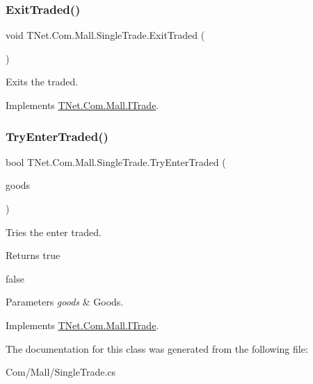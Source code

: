 \subsubsection{\texorpdfstring{Exit\+Traded()}{ExitTraded()}}
{\footnotesize\ttfamily void T\+Net.\+Com.\+Mall.\+Single\+Trade.\+Exit\+Traded (\begin{DoxyParamCaption}{ }\end{DoxyParamCaption})}



Exits the traded. 



Implements \mbox{\hyperlink{interface_t_net_1_1_com_1_1_mall_1_1_i_trade_acdc77a56a409b403d8bad022031c8bbf}{T\+Net.\+Com.\+Mall.\+I\+Trade}}.

\mbox{\label{class_t_net_1_1_com_1_1_mall_1_1_single_trade_a1648ff3445ce2e71ba32fb4c1c0dfebf}} 
\subsubsection{\texorpdfstring{Try\+Enter\+Traded()}{TryEnterTraded()}}
{\footnotesize\ttfamily bool T\+Net.\+Com.\+Mall.\+Single\+Trade.\+Try\+Enter\+Traded (\begin{DoxyParamCaption}\item[{\mbox{\hyperlink{class_t_net_1_1_com_1_1_model_1_1_goods_data}{Goods\+Data}}}]{goods }\end{DoxyParamCaption})}



Tries the enter traded. 

\begin{DoxyReturn}{Returns}
true
\end{DoxyReturn}
{\ttfamily false} 
\begin{DoxyParams}{Parameters}
{\em goods} & Goods.\\
\hline
\end{DoxyParams}


Implements \mbox{\hyperlink{interface_t_net_1_1_com_1_1_mall_1_1_i_trade_a3812ebe5aec424adfe8556739290149a}{T\+Net.\+Com.\+Mall.\+I\+Trade}}.



The documentation for this class was generated from the following file\+:\begin{DoxyCompactItemize}
\item 
Com/\+Mall/Single\+Trade.\+cs\end{DoxyCompactItemize}
